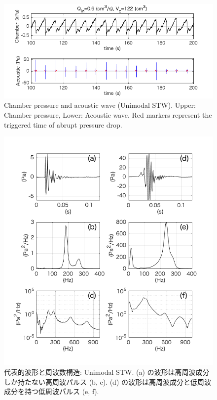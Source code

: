 \documentclass[12pt]{article}
\begin{document}
\clearpage
\begin{figure}[H]
\begin{center}
\includegraphics[scale=1] {MonoPAtime.png} 
\caption{Chamber pressure and acoustic wave (Unimodal STW). Upper: Chamber pressure, Lower: Acoustic wave. Red markers represent the triggered time of abrupt pressure drop.}
\label{MonoPAtime}
\end{center}
\end{figure} 

\begin{figure}[H]
\begin{center}
\includegraphics[scale=1] {Monowaveform.png} 
\caption{代表的波形と周波数構造: Unimodal STW. (a) の波形は高周波成分しか持たない高周波パルス (b, c). (d) の波形は高周波成分と低周波成分を持つ低周波パルス (e, f).}
\label{Monowaveform}
\end{center}
\end{figure}
\end{document}
